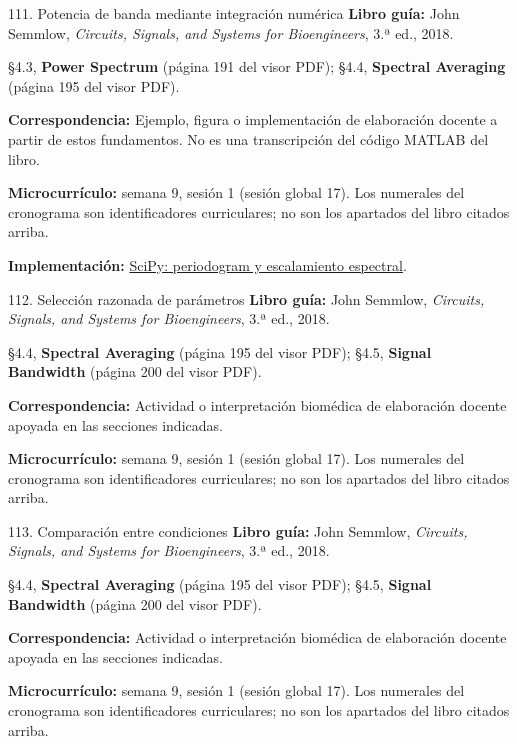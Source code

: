 \documentclass[
  10pt,
  ignorenonframetext,
  aspectratio=169,
  spanish,
]{beamer}
\begin{document}
\begin{frame}{111. Potencia de banda mediante integración numérica}
\label{potencia-de-banda-mediante-integraciuxf3n-numuxe9rica}
\textbf{Libro guía:} John Semmlow, \emph{Circuits, Signals, and Systems
for Bioengineers}, 3.ª ed., 2018.

§4.3, \textbf{Power Spectrum} (página 191 del visor PDF); §4.4,
\textbf{Spectral Averaging} (página 195 del visor PDF).

\textbf{Correspondencia:} Ejemplo, figura o implementación de
elaboración docente a partir de estos fundamentos. No es una
transcripción del código MATLAB del libro.

\textbf{Microcurrículo:} semana 9, sesión 1 (sesión global 17). Los
numerales del cronograma son identificadores curriculares; no son los
apartados del libro citados arriba.

\textbf{Implementación:}
\href{https://docs.scipy.org/doc/scipy/reference/generated/scipy.signal.periodogram.html}{SciPy:
periodogram y escalamiento espectral}.
\end{frame}

\begin{frame}{112. Selección razonada de parámetros}
\label{selecciuxf3n-razonada-de-paruxe1metros}
\textbf{Libro guía:} John Semmlow, \emph{Circuits, Signals, and Systems
for Bioengineers}, 3.ª ed., 2018.

§4.4, \textbf{Spectral Averaging} (página 195 del visor PDF); §4.5,
\textbf{Signal Bandwidth} (página 200 del visor PDF).

\textbf{Correspondencia:} Actividad o interpretación biomédica de
elaboración docente apoyada en las secciones indicadas.

\textbf{Microcurrículo:} semana 9, sesión 1 (sesión global 17). Los
numerales del cronograma son identificadores curriculares; no son los
apartados del libro citados arriba.
\end{frame}

\begin{frame}{113. Comparación entre condiciones}
\label{comparaciuxf3n-entre-condiciones}
\textbf{Libro guía:} John Semmlow, \emph{Circuits, Signals, and Systems
for Bioengineers}, 3.ª ed., 2018.

§4.4, \textbf{Spectral Averaging} (página 195 del visor PDF); §4.5,
\textbf{Signal Bandwidth} (página 200 del visor PDF).

\textbf{Correspondencia:} Actividad o interpretación biomédica de
elaboración docente apoyada en las secciones indicadas.

\textbf{Microcurrículo:} semana 9, sesión 1 (sesión global 17). Los
numerales del cronograma son identificadores curriculares; no son los
apartados del libro citados arriba.
\end{frame}
\end{document}
